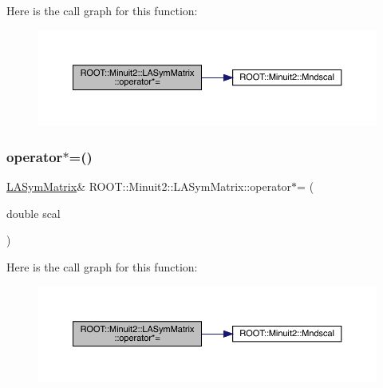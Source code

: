 Here is the call graph for this function\+:
\nopagebreak
\begin{figure}[H]
\begin{center}
\leavevmode
\includegraphics[width=350pt]{d3/d72/classROOT_1_1Minuit2_1_1LASymMatrix_abb10e4e092df8072bf59de3a0880b336_cgraph}
\end{center}
\end{figure}
\mbox{\label{classROOT_1_1Minuit2_1_1LASymMatrix_abb10e4e092df8072bf59de3a0880b336}} 
\subsubsection{\texorpdfstring{operator$\ast$=()}{operator*=()}\hspace{0.1cm}{\footnotesize\ttfamily [3/3]}}
{\footnotesize\ttfamily \mbox{\hyperlink{classROOT_1_1Minuit2_1_1LASymMatrix}{L\+A\+Sym\+Matrix}}\& R\+O\+O\+T\+::\+Minuit2\+::\+L\+A\+Sym\+Matrix\+::operator$\ast$= (\begin{DoxyParamCaption}\item[{double}]{scal }\end{DoxyParamCaption})\hspace{0.3cm}{\ttfamily [inline]}}

Here is the call graph for this function\+:
\nopagebreak
\begin{figure}[H]
\begin{center}
\leavevmode
\includegraphics[width=350pt]{d3/d72/classROOT_1_1Minuit2_1_1LASymMatrix_abb10e4e092df8072bf59de3a0880b336_cgraph}
\end{center}
\end{figure}
\mbox{\label{classROOT_1_1Minuit2_1_1LASymMatrix_a36e303de732b9277e57d27f91bb0d56a}} 
